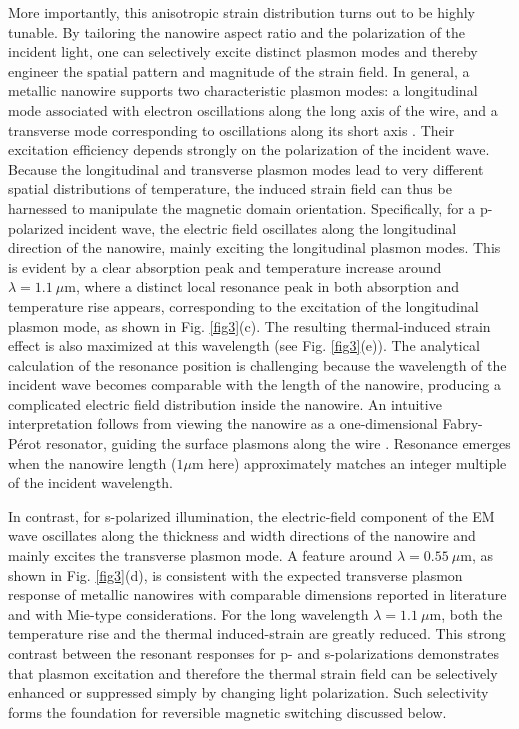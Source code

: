 \documentclass[aps,prl,reprint,floatfix,longbibliography,twocolumn]{revtex4-2}
\begin{document}
More importantly, this anisotropic strain distribution turns out to be highly tunable. By tailoring the nanowire aspect ratio and the polarization of the incident light, one can selectively excite distinct plasmon modes and thereby engineer the spatial pattern and magnitude of the strain field. In general, a metallic nanowire supports two characteristic plasmon modes: a longitudinal mode associated with electron oscillations along the long axis of the wire, and a transverse mode corresponding to oscillations along its short axis \cite{Baffou2013}. Their excitation efficiency depends strongly on the polarization of the incident wave. Because the longitudinal and transverse plasmon modes lead to very different spatial distributions of temperature, the induced strain field can thus be harnessed to manipulate the magnetic domain orientation. Specifically, for a p-polarized incident wave, the electric field oscillates along the longitudinal direction of the nanowire, mainly exciting the longitudinal plasmon modes. This is evident by a clear absorption peak and temperature increase around $\lambda=1.1~\mu \mathrm{m}$, where a distinct local resonance peak in both absorption and temperature rise appears, corresponding to the excitation of the longitudinal plasmon mode, as shown in Fig. \ref{fig3}(c). The resulting thermal-induced strain effect is also maximized at this wavelength (see Fig. \ref{fig3}(e)). The analytical calculation of the resonance position is challenging because the wavelength of the incident wave becomes comparable with the length of the nanowire, producing a complicated electric field distribution inside the nanowire. An intuitive interpretation follows from viewing the nanowire as a one-dimensional Fabry-P\'{e}rot resonator, guiding the surface plasmons along the wire \cite{DorfNL2009,AlbertAN2011}. Resonance emerges when the nanowire length ($1\mu \mathrm{m}$ here) approximately matches an integer multiple of the incident wavelength.

In contrast, for s-polarized illumination, the electric-field component of the EM wave oscillates along the thickness and width directions of the nanowire and mainly excites the transverse plasmon mode. A feature around $\lambda=0.55~\mu \mathrm{m}$, as shown in Fig. \ref{fig3}(d), is consistent with the expected transverse plasmon response of metallic nanowires with comparable dimensions reported in literature \cite{Baffou2010, Bohren1983} and with Mie-type considerations. For the long wavelength $\lambda=1.1~\mu \mathrm{m}$, both the temperature rise and the thermal induced-strain are greatly reduced. This strong contrast between the resonant responses for p- and s-polarizations demonstrates that plasmon excitation and therefore the thermal strain field can be selectively enhanced or suppressed simply by changing light polarization. Such selectivity forms the foundation for reversible magnetic switching discussed below.
\end{document}
